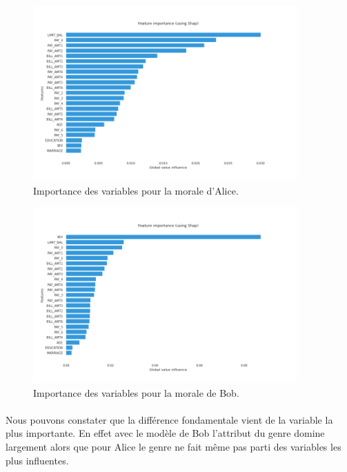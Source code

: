 \documentclass[10pt, french, a4paper]{report}
\begin{document}
\begin{figure}[hbt!]
  \centering
  \includegraphics[width=0.9\textwidth]{images/global_explain_morale_a.png}
  \caption{Importance des variables pour la morale d'Alice.}
  \label{fig:global_morale_b}
\end{figure}
\begin{figure}[hbt!]
  \centering
  \includegraphics[width=0.9\textwidth]{images/global_explain_morale_b.png}
  \caption{Importance des variables pour la morale de Bob.}
  \label{fig:global_morale_a}
\end{figure}

\paragraph{}
Nous pouvons constater que la différence fondamentale vient de la variable la plus importante. En effet avec le modèle de Bob l'attribut du genre domine largement alors que pour Alice le genre ne fait même pas parti des variables les plus influentes.
\end{document}
